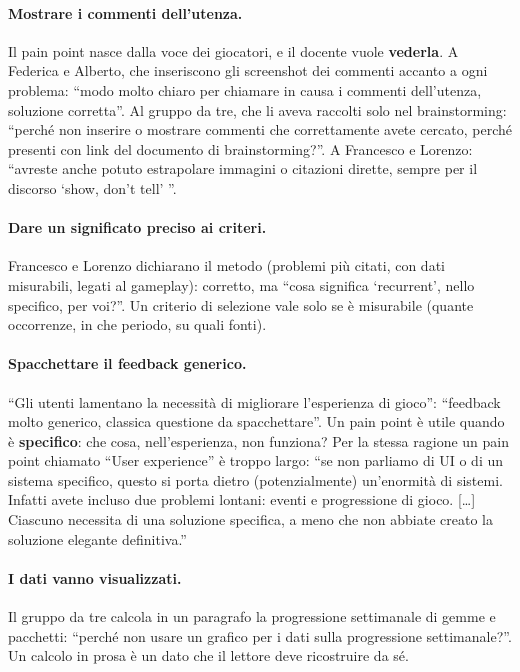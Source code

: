 \paragraph{Mostrare i commenti dell'utenza.} Il pain point nasce dalla voce
dei giocatori, e il docente vuole \textbf{vederla}. A Federica e Alberto, che
inseriscono gli screenshot dei commenti accanto a ogni problema: ``modo molto
chiaro per chiamare in causa i commenti dell'utenza, soluzione corretta''. Al
gruppo da tre, che li aveva raccolti solo nel brainstorming: ``perché non
inserire o mostrare commenti che correttamente avete cercato, perché presenti
con link del documento di brainstorming?''. A Francesco e Lorenzo: ``avreste
anche potuto estrapolare immagini o citazioni dirette, sempre per il discorso
`show, don't tell' ''.

\paragraph{Dare un significato preciso ai criteri.} Francesco e Lorenzo
dichiarano il metodo (problemi più citati, con dati misurabili, legati al
gameplay): corretto, ma ``cosa significa `recurrent', nello specifico, per
voi?''. Un criterio di selezione vale solo se è misurabile (quante
occorrenze, in che periodo, su quali fonti).

\paragraph{Spacchettare il feedback generico.} ``Gli utenti lamentano la
necessità di migliorare l'esperienza di gioco'': ``feedback molto generico,
classica questione da spacchettare''. Un pain point è utile quando è
\textbf{specifico}: che cosa, nell'esperienza, non funziona? Per la stessa
ragione un pain point chiamato ``User experience'' è troppo largo: ``se non
parliamo di UI o di un sistema specifico, questo si porta dietro
(potenzialmente) un'enormità di sistemi. Infatti avete incluso due problemi
lontani: eventi e progressione di gioco. [\dots] Ciascuno necessita di una
soluzione specifica, a meno che non abbiate creato la soluzione elegante
definitiva.''

\paragraph{I dati vanno visualizzati.} Il gruppo da tre calcola in un
paragrafo la progressione settimanale di gemme e pacchetti: ``perché non usare
un grafico per i dati sulla progressione settimanale?''. Un calcolo in prosa è
un dato che il lettore deve ricostruire da sé.


